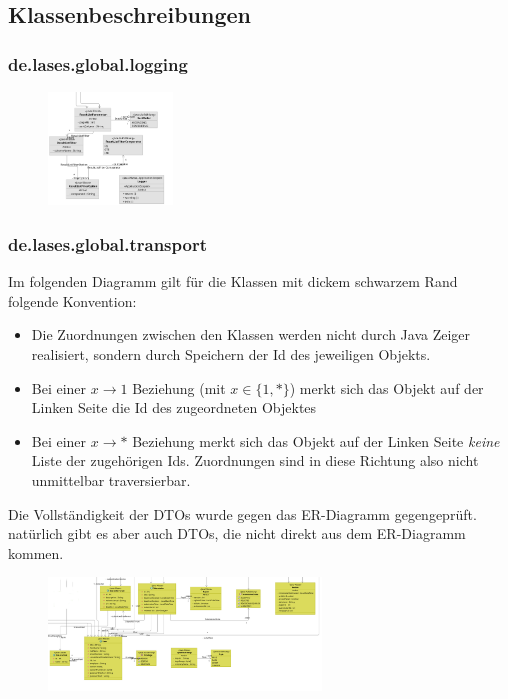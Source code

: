 
\subsection{Klassenbeschreibungen}

\subsubsection{de.lases.global.logging}

\begin{figure}[H]
	\centering
	\includegraphics[height=3cm]{graphics/global_util}
\end{figure}


\subsubsection{de.lases.global.transport}

Im folgenden Diagramm gilt für die Klassen mit dickem schwarzem Rand folgende Konvention:
\begin{itemize}
	\item Die Zuordnungen zwischen den Klassen werden nicht durch Java Zeiger realisiert, sondern durch Speichern der Id des jeweiligen Objekts.
	\item Bei einer $x \rightarrow 1$ Beziehung (mit $x \in \{1, *\}$) merkt sich das Objekt auf der Linken Seite die Id des zugeordneten Objektes
	\item Bei einer $x \rightarrow *$ Beziehung merkt sich das Objekt auf der Linken Seite \emph{keine} Liste der zugehörigen Ids. Zuordnungen sind in diese Richtung also nicht unmittelbar traversierbar.
\end{itemize}
Die Vollständigkeit der DTOs wurde gegen das ER-Diagramm gegengeprüft.
natürlich gibt es aber auch DTOs, die nicht direkt aus dem ER-Diagramm kommen.
\begin{figure}[H]
	\centering
	\includegraphics[height=3cm]{graphics/global_transport}
\end{figure}


